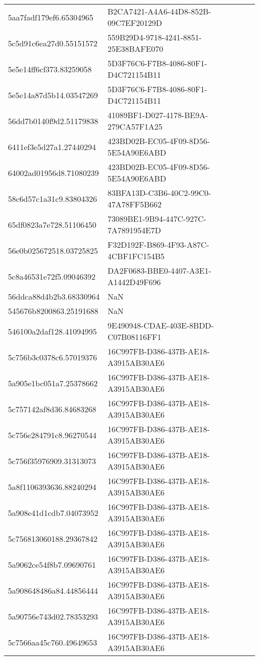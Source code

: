 \begin{tabular}{ll}
5aa7fadf179ef6.65304965 & B2CA7421-A4A6-44D8-852B-09C7EF20129D \\
5c5d91c6ea27d0.55151572 & 559B29D4-9718-4241-8851-25E38BAFE070 \\
5e5e14ff6cf373.83259058 & 5D3F76C6-F7B8-4086-80F1-D4C721154B11 \\
5e5e14a87d5b14.03547269 & 5D3F76C6-F7B8-4086-80F1-D4C721154B11 \\
56dd7b0140f9d2.51179838 & 41089BF1-D027-4178-BE9A-279CA57F1A25 \\
6411ef3e5d27a1.27440294 & 423BD02B-EC05-4F09-8D56-5E54A90E6ABD \\
64002ad01956d8.71080239 & 423BD02B-EC05-4F09-8D56-5E54A90E6ABD \\
58c6d57c1a31c9.83804326 & 83BFA13D-C3B6-40C2-99C0-47A78FF5B662 \\
65df0823a7e728.51106450 & 73089BE1-9B94-447C-927C-7A7891954E7D \\
56e0b025672518.03725825 & F32D192F-B869-4F93-A87C-4CBF1FC154B5 \\
5c8a46531e72f5.09046392 & DA2F0683-BBE0-4407-A3E1-A1442D49F696 \\
56ddca88d4b2b3.68330964 & NaN \\
545676b8200863.25191688 & NaN \\
546100a2daf128.41094995 & 9E490948-CDAE-403E-8BDD-C07B08116FF1 \\
5c756b3c0378c6.57019376 & 16C997FB-D386-437B-AE18-A3915AB30AE6 \\
5a905e1bc051a7.25378662 & 16C997FB-D386-437B-AE18-A3915AB30AE6 \\
5c757142af8d36.84683268 & 16C997FB-D386-437B-AE18-A3915AB30AE6 \\
5c756e284791c8.96270544 & 16C997FB-D386-437B-AE18-A3915AB30AE6 \\
5c756f35976909.31313073 & 16C997FB-D386-437B-AE18-A3915AB30AE6 \\
5a8f1106393636.88240294 & 16C997FB-D386-437B-AE18-A3915AB30AE6 \\
5a908e41d1cdb7.04073952 & 16C997FB-D386-437B-AE18-A3915AB30AE6 \\
5c756813060188.29367842 & 16C997FB-D386-437B-AE18-A3915AB30AE6 \\
5a9062ce54f8b7.09690761 & 16C997FB-D386-437B-AE18-A3915AB30AE6 \\
5a908648486a84.44856444 & 16C997FB-D386-437B-AE18-A3915AB30AE6 \\
5a90756e743d02.78353293 & 16C997FB-D386-437B-AE18-A3915AB30AE6 \\
5c7566aa45c760.49649653 & 16C997FB-D386-437B-AE18-A3915AB30AE6 \\

\end{tabular}
